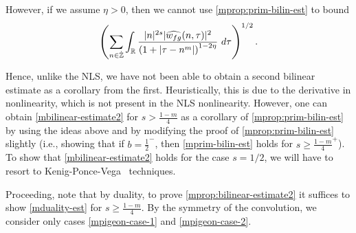 However, if we assume $\eta >0$, then
we cannot use \cref{mprop:prim-bilin-est} to bound
\begin{equation*}
	\begin{split}
		\left ( \sum_{n \in \dot{\mathbb{Z}}}\int_{\mathbb{R}} \frac{|n|^{2s} | \widehat{w_{fg}}(n, \tau) 
		|^2}{\left( 1 + | \tau - n^m | \right)^{1 - 2\eta}}\ d \tau
		\right)^{1/2}. 
	\end{split}
\end{equation*}
\begin{framed}
\begin{remark}
Hence, unlike the NLS, we have not been able to obtain a second bilinear
estimate as a corollary from the first. Heuristically, this is due to the
derivative in nonlinearity, which is not present in the NLS nonlinearity.
However, one can obtain \eqref{mbilinear-estimate2} for $s>\frac{1-m}{4}$ as a
corollary of \cref{mprop:prim-bilin-est} by using the ideas
above and by modifying the proof of \cref{mprop:prim-bilin-est} slightly (i.e.,
showing that if $b = \frac{1}{2}^-$, then \eqref{mprim-bilin-est} holds for
$s\ge \frac{1-m}{4}^+$). To show that \eqref{mbilinear-estimate2} holds for the
case $s=1/2$, we will have to resort to Kenig-Ponce-Vega~\cite{Kenig:1996yn} techniques.
\end{remark}
\end{framed}
%
%
Proceeding, note that by duality, to prove \cref{mprop:bilinear-estimate2} it
suffices to show \eqref{mduality-est} for $s \ge \frac{1-m}{4}$. By the symmetry of the convolution, we
consider only cases \eqref{mpigeon-case-1} and \eqref{mpigeon-case-2}.
%
%
